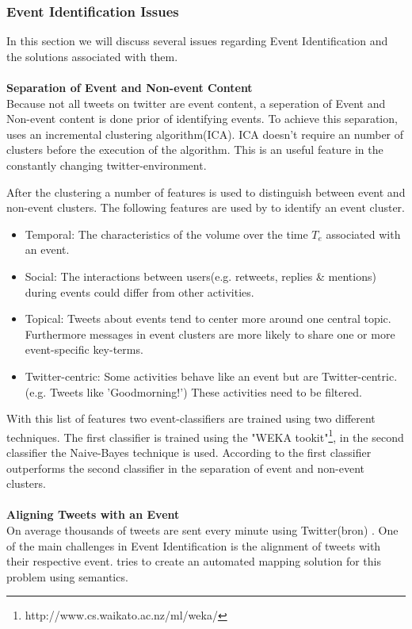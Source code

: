 \documentclass{article}
\begin{document}
\subsubsection{Event Identification Issues}
In this section we will discuss several issues regarding Event Identification and the solutions associated with them.
\\\\ 
\textbf{Separation of Event and Non-event Content}\\
Because not all tweets on twitter are event content, a seperation of Event and Non-event content is done prior of identifying events. To achieve this separation, \cite{eventident} uses an incremental clustering algorithm(ICA). ICA doesn't require an number of clusters before the execution of the algorithm. This is an useful feature in the constantly changing twitter-environment.

After the clustering a number of features is used to distinguish between event and non-event clusters. The following features are used by \cite{eventident} to identify an event cluster. 
\begin{itemize}
  \item Temporal: The characteristics of the volume over the time $T_e$ associated with an event. 
  \item Social: The interactions between users(e.g. retweets, replies \& mentions) during events could differ from other activities. 
  \item Topical: Tweets about events tend to center more around one central topic. Furthermore messages in event clusters are more likely to share one or more event-specific key-terms.  
  \item Twitter-centric: Some activities behave like an event but are Twitter-centric.(e.g. Tweets like 'Goodmorning!') These activities need to be filtered. 
\end{itemize}

With this list of features two event-classifiers are trained using two different techniques. The first classifier is trained using the "WEKA tookit"\footnote{http://www.cs.waikato.ac.nz/ml/weka/}, in the second classifier the  Naive-Bayes technique is used. According to \cite{eventident} the first classifier outperforms the second classifier in the separation of event and non-event clusters. 
\\\\
\textbf{Aligning Tweets with an Event} \\
On average thousands of tweets are sent every minute using Twitter(bron) . One of the main challenges in Event Identification is the alignment of tweets with their respective event. \cite{eventalign} tries to create an automated mapping solution for this problem using semantics.
\end{document}
